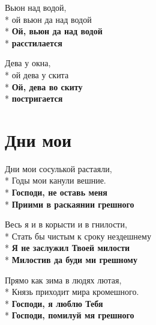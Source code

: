\medskip

\begin{minipage}{\linewidth}
Вьюн над водой,\\*
ой вьюн да над водой\\*
\textbf{Ой, вьюн да над водой}\\*
\textbf{расстилается}\\
\end{minipage}\par\medskip\nobreak

\medskip

\begin{minipage}{\linewidth}
Дева у окна,\\*
ой дева у скита\\*
\textbf{Ой, дева во скиту}\\*
\textbf{постригается}\\
\end{minipage}

\vspace{\fill}\newpage

\section{Дни мои}
\label{song:Дни_мои}

\medskip

\begin{minipage}{\linewidth}
Дни мои сосулькой растаяли,\\*
Годы мои канули вешние.\\*
\textbf{Господи, не оставь меня}\\*
\textbf{Приими в раскаянии грешного}\\
\end{minipage}\par\medskip\nobreak

\medskip

\begin{minipage}{\linewidth}
Весь я и в корысти и в гнилости,\\*
Стать бы чистым к сроку нездешнему\\*
\textbf{Я не заслужил Твоей милости}\\*
\textbf{Милостив да буди ми грешному}\\
\end{minipage}\par\medskip\nobreak

\medskip

\begin{minipage}{\linewidth}
Прямо как зима в людях лютая,\\*
Князь приходит мира кромешного.\\*
\textbf{Господи, я люблю Тебя}\\*
\textbf{Господи, помилуй мя грешного}\\
\end{minipage}

